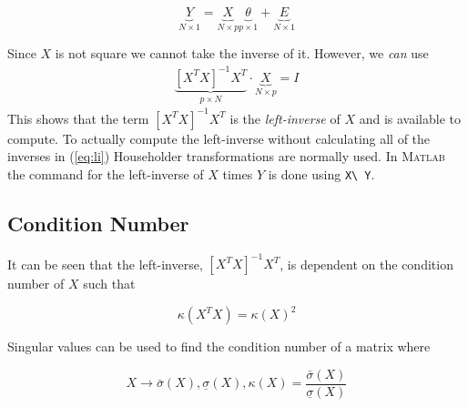 \begin{equation*}
\underbrace{Y}_{N\times1} = \underbrace{X}_{N\times p} \underbrace{\theta}_{p\times1} + \underbrace{E}_{N\times1}
\end{equation*}

Since $X$ is not square we cannot take the inverse of it.
However, we \textit{can} use
\begin{align}
\label{eq:li}
\underbrace{{[X^T X]}^{-1}X^T}_{p\times N} \cdot \underbrace{X}_{N\times p} = I
\end{align}
This shows that the term ${[X^T X]}^{-1}X^T$ is the \textit{left-inverse} of $X$ and is available to compute.
To actually compute the left-inverse without calculating all of the inverses in (\ref{eq:li}) Householder transformations are normally used.
In \textsc{Matlab} the command for the left-inverse of $X$ times $Y$ is done using \texttt{X\textbackslash~Y}.

\subsection{Condition Number}
It can be seen that the left-inverse, ${[X^T X]}^{-1}X^T$, is dependent on the condition number of $X$ such that

\begin{equation*}
\kappa(X^T X) = \kappa{(X)}^2
\end{equation*}

Singular values can be used to find the condition number of a matrix where

\begin{equation*}
X\rightarrow \bar{\sigma}(X), \underline{\sigma}(X), \kappa(X)=\frac{\bar{\sigma}(X)}{\underline{\sigma}(X)}
\end{equation*}

